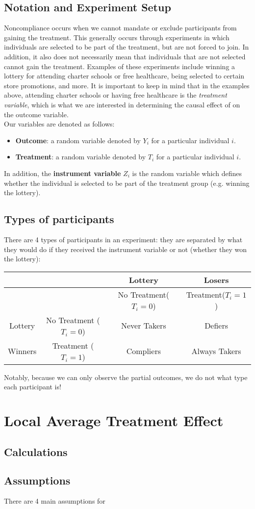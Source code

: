 \documentclass{article}
\begin{document}
\subsection{Notation and Experiment Setup}
Noncompliance occurs when we cannot mandate or exclude participants from gaining the treatment.
This generally occurs through experiments in which individuals are selected to be part of the treatment, but are not forced to join.
In addition, it also does not necessarily mean that individuals that are not selected cannot gain the treatment. 
Examples of these experiments include winning a lottery for attending charter schools or free healthcare, being selected to certain store promotions, and more. 
It is important to keep in mind that in the examples above, attending charter schools or having free healthcare is the \textit{treatment variable}, which is what we are interested in determining the causal effect of on the outcome variable. 
\\
Our variables are denoted as follows: 
\begin{itemize}
    \item \textbf{Outcome}: a random variable denoted by $Y_i$ for a particular individual $i$.
    \item \textbf{Treatment}: a random variable denoted by $T_i$ for a particular individual $i$.
\end{itemize}
In addition, the \textbf{instrument variable} $Z_i$ is the random variable which defines whether the individual is selected to be part of the treatment group (e.g. winning the lottery).

\subsection{Types of participants}
There are 4 types of participants in an experiment: they are separated by what they would do if they received the instrument variable or not (whether they won the lottery):
\begin{center}
    \begin{tabular}{c|ccc}
        &&Lottery&Losers \\ 
        \hline
         & &No Treatment($T_i=0$)&Treatment($T_i=1$) \\
         Lottery&No Treatment ($T_i=0$)&Never Takers&Defiers  \\
         Winners &Treatment ($T_i=1$)&Compliers&Always Takers \\
    \end{tabular}
\end{center}
Notably, because we can only observe the partial outcomes, we do not what type each participant is!



\section{Local Average Treatment Effect}
\subsection{Calculations}

\subsection{Assumptions}
There are 4 main assumptions for 
\end{document}
